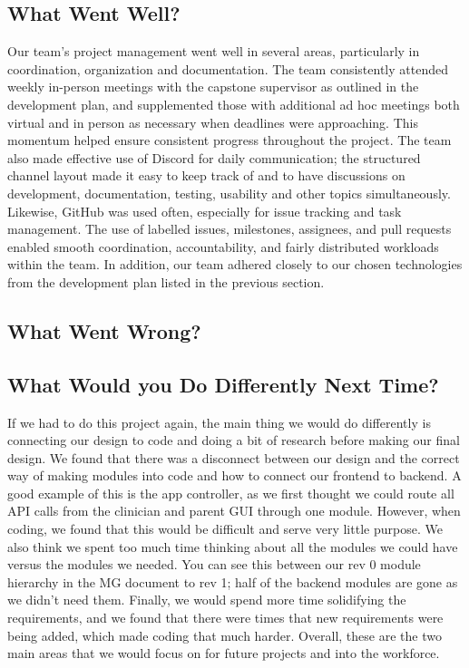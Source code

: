 \documentclass{article}
\begin{document}
\subsection{What Went Well?}


Our team's project management went well in several areas, particularly in coordination, organization and documentation. The team consistently attended weekly in-person meetings 
with the capstone supervisor as outlined in the development plan, and supplemented those with additional ad hoc meetings both virtual and in person as necessary when deadlines were 
approaching. This momentum helped ensure consistent progress throughout the project. The team also made effective use of Discord for daily communication; the structured channel layout 
made it easy to keep track of and to have discussions on development, documentation, testing, usability and other topics simultaneously. Likewise, GitHub was used often, especially 
for issue tracking and task management. The use of labelled issues, milestones, assignees, and pull requests enabled smooth coordination, accountability, and fairly distributed workloads 
within the team. In addition, our team adhered closely to our chosen technologies from the development plan listed in the previous section.

\subsection{What Went Wrong?}


\subsection{What Would you Do Differently Next Time?}

If we had to do this project again, the main thing we would do differently is connecting our design to code and doing a bit of research before making our final design. 
We found that there was a disconnect between our design and the correct way of making modules into code and how to connect our frontend to backend. A good example of this is 
the app controller, as we first thought we could route all API calls from the clinician and parent GUI through one module. However, when coding, we found that this would be 
difficult and serve very little purpose. We also think we spent too much time thinking about all the modules we could have versus the modules we needed. You can see this between our
rev 0 module hierarchy in the MG document to rev 1; half of the backend modules are gone as we didn't need them. Finally, we would spend more time solidifying the requirements, and we found that 
there were times that new requirements were being added, which made coding that much harder. Overall, these are the two main areas that we would focus on for future projects and into the workforce.
\end{document}
